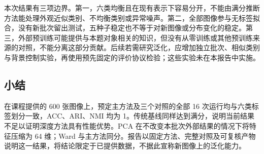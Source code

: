 
本次结果有三项边界。第一，六类均衡且在现有表示下容易分开，不能由满分推断方法能处理外观近似类别、不均衡类别或异常噪声。第二，全部图像参与无标签拟合，没有新批次留出测试，五种子稳定也不等于对新图像或分布变化的稳定。第三，外部预训练可能提供与本题对象相关的知识，但没有从零训练或其他预训练来源的对照，不能分离这部分贡献。后续若需研究泛化，应增加独立批次、相似类别与背景控制实验，再使用预先固定的评价协议检验；这些实验未在本报告中实施。

\subsection{小结}
在课程提供的 600 张图像上，预定主方法及三个对照的全部 16 次运行均与六类标签划分一致，ACC、ARI、NMI 均为 1。传统基线同样达到满分，说明当前结果不足以证明深度方法具有性能优势。PCA 在不改变本批次外部结果的情况下将特征压缩为 64 维；Ward 与主方法同分。报告以固定方法、完整对照及可复核产物说明这一结果，将结论限定于已提供数据，不据此宣称新图像上的泛化能力。
